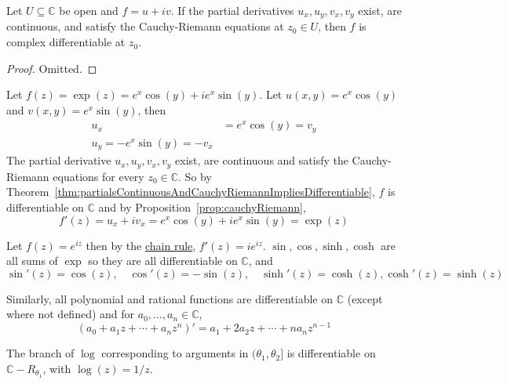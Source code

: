 \begin{theorem}\label{thm:partialsContinuousAndCauchyRiemannImpliesDifferentiable}
	Let $U \subseteq \mathbb{C}$ be open and $f = u + iv$. If the partial derivatives $u_x, u_y, v_x, v_y$ exist, are continuous, and satisfy the Cauchy-Riemann equations at $z_0 \in U$, then $f$ is complex differentiable at $z_0$.
\end{theorem}

\begin{proof}
	Omitted.
\end{proof}

\begin{example}
	Let $f(z) = \exp(z) = e^x \cos(y) + i e^x \sin(y)$. Let $u(x, y) = e^x \cos(y)$ and $v(x, y) = e^x \sin(y)$, then
	\[
		\begin{aligned}
			u_x & = e^x \cos(y) = v_y \\
			u_y = -e^x \sin(y) = -v_x
		\end{aligned}
	\]
	The partial derivative $u_x, u_y, v_x, v_y$ exist, are continuous and satisfy the Cauchy-Riemann equations for every $z_0 \in \mathbb{C}$. So by Theorem~\ref{thm:partialsContinuousAndCauchyRiemannImpliesDifferentiable}, $f$ is differentiable on $\mathbb{C}$ and by Proposition~\ref{prop:cauchyRiemann},
	\[
		f'(z) = u_x + i v_x = e^x \cos(y) + i e^x \sin(y) = \exp(z)
	\]
\end{example}

\begin{example}
	Let $f(z) = e^{iz}$ then by the \hyperref[prop:chainRule]{chain rule}, $f'(z) = i e^{iz}$. $\sin, \cos, \sinh, \cosh$ are all sums of $\exp$ so they are all differentiable on $\mathbb{C}$, and
	\[
		\sin'(z) = \cos(z), \quad \cos'(z) = -\sin(z), \quad \sinh'(z) = \cosh(z), \cosh'(z) = \sinh(z)
	\]
\end{example}

\begin{example}
	Similarly, all polynomial and rational functions are differentiable on $\mathbb{C}$ (except where not defined) and for $a_0, \dots, a_n \in \mathbb{C}$,
	\[
		(a_0 + a_1 z + \cdots + a_n z^n)' = a_1 + 2 a_2 z + \cdots + n a_n z^{n - 1}
	\]
\end{example}

\begin{example}
	The branch of $\log$ corresponding to arguments in $(\theta_1, \theta_2]$ is differentiable on $\mathbb{C} - R_{\theta_1}$, with $\log(z) = 1/z$.
\end{example}

